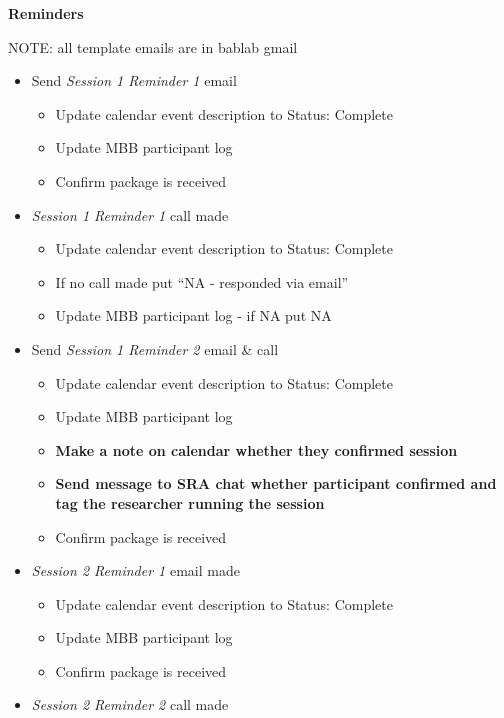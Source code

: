 \documentclass[]{book}
\providecommand{\tightlist}{%
  \setlength{\itemsep}{0pt}\setlength{\parskip}{0pt}}
\begin{document}
\textbf{Reminders}

NOTE: all template emails are in bablab gmail

\begin{itemize}
\tightlist
\item
  Send \emph{Session 1 Reminder 1} email

  \begin{itemize}
  \tightlist
  \item
    Update calendar event description to Status: Complete
  \item
    Update MBB participant log
  \item
    Confirm package is received
  \end{itemize}
\item
  \emph{Session 1 Reminder 1} call made

  \begin{itemize}
  \tightlist
  \item
    Update calendar event description to Status: Complete
  \item
    If no call made put ``NA - responded via email''
  \item
    Update MBB participant log - if NA put NA
  \end{itemize}
\item
  Send \emph{Session 1 Reminder 2} email \& call

  \begin{itemize}
  \tightlist
  \item
    Update calendar event description to Status: Complete
  \item
    Update MBB participant log
  \item
    \textbf{Make a note on calendar whether they confirmed session}
  \item
    \textbf{Send message to SRA chat whether participant confirmed and tag the researcher running the session}
  \item
    Confirm package is received
  \end{itemize}
\item
  \emph{Session 2 Reminder 1} email made

  \begin{itemize}
  \tightlist
  \item
    Update calendar event description to Status: Complete
  \item
    Update MBB participant log
  \item
    Confirm package is received
  \end{itemize}
\item
  \emph{Session 2 Reminder 2} call made


\end{itemize}
\end{document}
